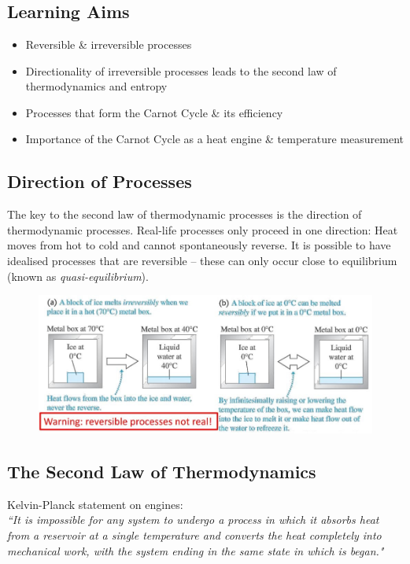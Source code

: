 \documentclass[a4paper, 11pt, normalem]{report}
\begin{document}
\chapter{}
\section{Learning Aims}
\begin{itemize}
	\item Reversible \& irreversible processes
	\item Directionality of irreversible processes leads to the second law of thermodynamics and entropy
	\item Processes that form the Carnot Cycle \& its efficiency
	\item Importance of the Carnot Cycle as a heat engine \& temperature measurement
\end{itemize}

\section{Direction of Processes}
The key to the second law of thermodynamic processes is the direction of thermodynamic processes.
Real-life processes only proceed in one direction: Heat moves from hot to cold and cannot spontaneously reverse.
It is possible to have idealised processes that are reversible -- these can only occur close to equilibrium (known as \emph{quasi-equilibrium}).
\begin{figure}[H]
    \centering
    \includegraphics[scale=0.6]{Icebox.jpg}
\end{figure}

\section{The Second Law of Thermodynamics}
Kelvin-Planck statement on engines: \\
\emph{``It is impossible for any system to undergo a process in which it absorbs heat from a reservoir at a single temperature and converts the heat completely into mechanical work, with the system ending in the same state in which is began."}
\end{document}
